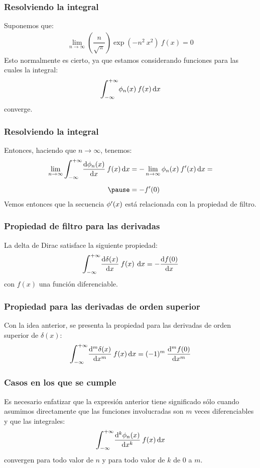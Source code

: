 \documentclass[12pt]{beamer}
\begin{document}
\begin{frame}
\frametitle{Resolviendo la integral}
Suponemos que:
\pause
\begin{align*}
\lim_{n \to \infty} \left( \dfrac{n}{\sqrt{\pi}} \right) \exp(-n^{2} \: x^{2}) \: f (x) = 0
\end{align*}
\pause
Esto normalmente es cierto, ya que estamos considerando funciones para las cuales la integral:
\pause
\begin{align*}
\scaleint{6ex}_{\bs -\infty}^{+\infty} \phi_{n}(x) \: f (x) \dd{x} 
\end{align*}
converge.
\end{frame}

\begin{frame}
\frametitle{Resolviendo la integral}
Entonces, haciendo que $n \to \infty$, tenemos:
\pause
\begin{eqnarray*}
\begin{aligned}
\lim_{n \to \infty} \scaleint{6ex}_{\bs -\infty}^{+\infty} \dv{\phi_{n}(x)}{x} \: f (x) \dd{x} &= - \lim_{n \to \infty} \phi_{n}(x) \: \pderivada{f} (x) \dd{x} =  \\[0.5em] \pause
&= - \pderivada{f} (0)
\end{aligned}
\end{eqnarray*}
\pause
Vemos entonces que la secuencia ${\phi}^{\prime} (x)$ está relacionada con la propiedad de filtro.
\end{frame}

\begin{frame}
\frametitle{Propiedad de filtro para las derivadas}
La delta de Dirac satisface la siguiente propiedad:
\pause
\begin{align*}
\scaleint{6ex}_{\bs -\infty}^{+\infty} \dv{\delta(x)}{x} \: f (x) \: \dd{x} = - \dv{f (0)}{x}
\end{align*}
con $f (x)$ una función diferenciable.
\end{frame}

\begin{frame}
\frametitle{Propiedad para las derivadas de orden superior}
Con la idea anterior, se presenta la propiedad para las derivadas de orden superior de $\delta (x)$:
\pause
\begin{align*}
\scaleint{6ex}_{\bs -\infty}^{+\infty} \dv[m]{\delta (x)}{x} \: f (x) \dd{x} =  (-1)^{m} \: \dv[m]{f (0)}{x}
\end{align*}
\end{frame}

\begin{frame}
\frametitle{Casos en los que se cumple}
Es necesario enfatizar que la expresión anterior tiene significado sólo cuando asumimos directamente que las funciones involucradas son $m$ veces diferenciables y que las integrales:
\pause
\begin{align*}
\scaleint{6ex}_{\bs -\infty}^{+\infty} \dv[k]{\phi_{n}(x)}{x} \: f (x) \dd{x}
\end{align*}
convergen para todo valor de $n$ y para todo valor de $k$ de $0$ a $m$.
\end{frame}
\end{document}
